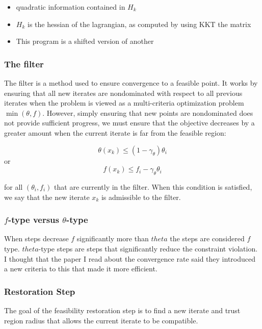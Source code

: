 \documentclass{article}
\begin{document}
\begin{itemize}
\item quadratic information contained in $H_k$
\item $H_k$ is the hessian of the lagrangian, as computed by using KKT the matrix
\item This program is a shifted version of another
\end{itemize}



\subsubsection{The filter}

The filter is a method used to ensure convergence to a feasible point.
It works by ensuring that all new iterates are nondominated with respect to all previous iterates when the problem is viewed as a multi-criteria optimization problem $\min (\theta, f)$. However, simply ensuring that new points are nondominated does not provide sufficient progress, we must ensure that the objective decreases by a greater amount when the current iterate is far from the feasible region:

\[
\theta(x_k) \le (1-\gamma_{\theta})\theta_i
\]
or
\[
f(x_k) \le f_i -\gamma_{\theta}\theta_i
\]

for all $(\theta_i, f_i)$ that are currently in the filter.
When this condition is satisfied, we say that the new iterate $x_k$ is admissible to the filter.

\subsubsection{$f$-type versus $\theta$-type}

When steps decrease $f$ significantly more than $theta$ the steps are considered $f$ type.
$theta$-type steps are steps that significantly reduce the constraint violation.
I thought that the paper I read about the convergence rate said they introduced a new criteria to this that made it more efficient.

\subsubsection{Restoration Step}

The goal of the feasibility restoration step is to find a new iterate and trust region radius that allows the current iterate to be compatible.
\end{document}
